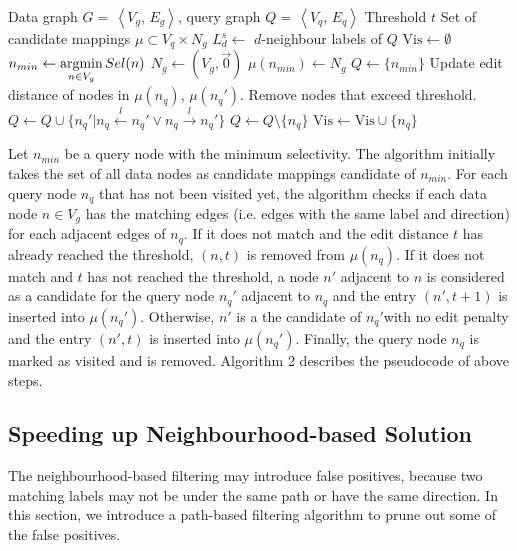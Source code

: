 \documentclass{sigmod}
\newcommand{\argmin}{\operatornamewithlimits{argmin}}
\begin{document}
\begin{algorithm}
\caption{}
\label{alg:NeighbourhoodPruning}
\begin{algorithmic}[1]
\setcounter{ALG@line}{0}
\INPUT Data graph $G=\,\left \langle V_g,\,E_g\right\rangle$, query graph $Q=\,\left \langle V_q,\,E_q\right\rangle$
\INPUT Threshold $t$
\OUTPUT Set of candidate mappings $\mu \subset V_q \times N_g $ 
\State $L_d^s \leftarrow$ $d$-neighbour labels of $Q$
\State $\text{Vis} \leftarrow \emptyset$
\State $n_{min} \leftarrow \argmin\limits_{n \in V_g} Sel(n)$
\State $N_g \leftarrow (V_g, \vec{0})$ 
\State $\mu(n_{min}) \leftarrow N_g$
\State $Q \leftarrow \{n_{min}\}$
		\State Update edit distance of nodes in $\mu(n_q)$, $\mu(n_q')$.
		\State Remove nodes that exceed threshold. 
	\EndIf
	\State $Q \leftarrow Q \cup \{n_q' | n_q \xleftarrow{l} n_{q}' \vee n_q \xrightarrow{l} n_{q}' \}$
	\State $Q \leftarrow Q \setminus \{n_q\}$
	\State $\text{Vis} \leftarrow \text{Vis} \cup \{n_q\}$
\EndFor
\end{algorithmic}
\end{algorithm}

Let $n_{min}$ be a query node with the minimum selectivity. The algorithm initially takes the set of all data nodes as candidate mappings candidate of $n_{min}$. For each query node $n_q$ that has not been visited yet, the algorithm checks if each data node $n \in V_g$ has the matching edges (i.e. edges with the same label and direction) for each adjacent edges of $n_q$. If it does not match and the edit distance $t$ has already reached the threshold, $(n, t)$ is removed from $\mu(n_q)$. If it does not match and $t$ has not reached the threshold, a node $n'$ adjacent to $n$ is considered  as a candidate for the query node $n_q'$ adjacent to $n_q$ and the entry $(n',t+1)$ is inserted into $\mu(n_q')$. Otherwise,  $n'$ is a the candidate of $n_q'$with no edit penalty and the entry $(n',t)$ is inserted into $\mu(n_q')$. Finally, the query node $n_q$ is marked as visited and is removed. Algorithm 2 describes the pseudocode of above steps. 

\subsection{Speeding up Neighbourhood-based Solution}
The neighbourhood-based filtering may introduce false positives, because two matching labels may not be under the same path or have the same direction. In this section, we introduce a path-based filtering algorithm to prune out some of the false positives.
\end{document}
